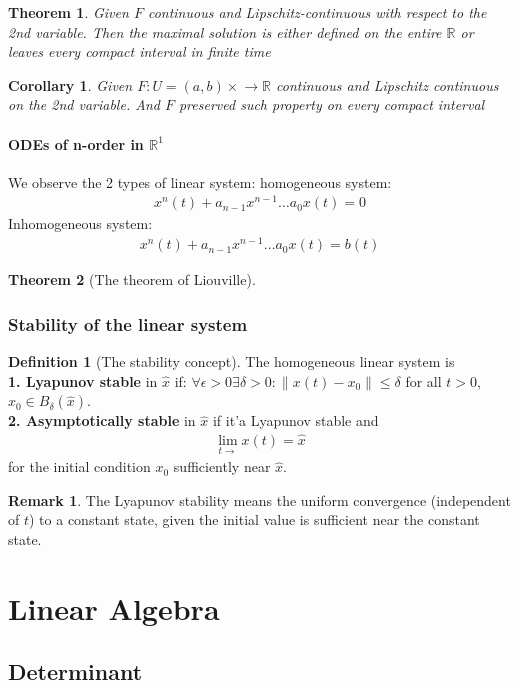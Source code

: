 \documentclass[12pt,fleqn]{book}
\newtheorem{theorem}{Theorem}[section]
\newtheorem{corollary}{Corollary}[theorem]
\theoremstyle{definition}
\newtheorem{definition}{Definition}[section]
\newtheorem*{remark}{Remark}
\begin{document}
\begin{theorem}
	Given $F$ continuous and Lipschitz-continuous with respect to the 2nd variable. Then the maximal solution is either defined on the entire $\mathbb{R}$ or leaves every compact interval in finite time
\end{theorem}

\begin{corollary}
	Given $F: U = (a, b) \times \mathbb \rightarrow \mathbb{R}$ continuous and Lipschitz continuous on the 2nd variable. And $F$ preserved such property on every compact interval 
\end{corollary}


\subsubsection*{ODEs of n-order in $\mathbb{R}^1$}
We observe the 2 types of linear system:
homogeneous system:
\begin{align}
	x^{n}(t) + a_{n-1}x^{n-1} \dots a_0 x(t) = 0
\end{align}
Inhomogeneous system:
\begin{align}
	x^n(t) + a_{n-1}x^{n-1} \dots a_0 x(t) = b(t)
\end{align}

\begin{theorem}[The theorem of Liouville]
\end{theorem}


\subsection{Stability of the linear system}
\begin{definition}[The stability concept]
The homogeneous linear system is \\
\textbf{1. Lyapunov stable} in $\hat{x}$ if: 
	$\forall \epsilon > 0 \exists \delta > 0: \|x(t) - x_0\| \le \delta$ for all $t > 0$, $x_0 \in B_\delta(\hat{x})$.\\
\textbf{2. Asymptotically stable} in $\hat{x}$ if it'a Lyapunov stable and 
\begin{align*}
	\lim_{t \rightarrow} x(t) = \hat{x}
\end{align*}
for the initial condition $x_0$ sufficiently near $\hat{x}$. 
\end{definition}
\begin{remark}
The Lyapunov stability means the uniform convergence (independent of $t$) to a constant state, given the initial value is sufficient near the constant state. 	
\end{remark}


\chapter{Linear Algebra}
\section{Determinant}
\end{document}

